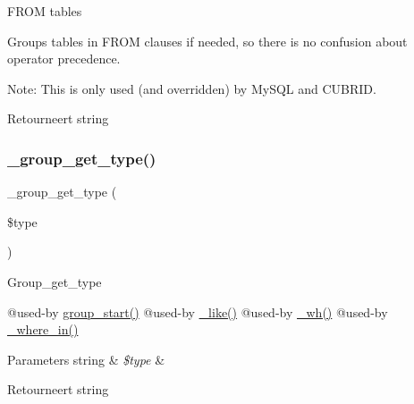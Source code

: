 F\+R\+OM tables

Groups tables in F\+R\+OM clauses if needed, so there is no confusion about operator precedence.

Note\+: This is only used (and overridden) by My\+S\+QL and C\+U\+B\+R\+ID.

\begin{DoxyReturn}{Retourneert}
string 
\end{DoxyReturn}
\mbox{\label{class_c_i___d_b__query__builder_a0101619da9c48cfa269730ace38a774a}} 
\subsubsection{\texorpdfstring{\_group\_get\_type()}{\_group\_get\_type()}}
{\footnotesize\ttfamily \+\_\+group\+\_\+get\+\_\+type (\begin{DoxyParamCaption}\item[{}]{\$type }\end{DoxyParamCaption})\hspace{0.3cm}{\ttfamily [protected]}}

Group\+\_\+get\+\_\+type

@used-\/by \mbox{\hyperlink{class_c_i___d_b__query__builder_a0ad001f7f7d1a41fdee4a85b4f7db9b4}{group\+\_\+start()}} @used-\/by \mbox{\hyperlink{class_c_i___d_b__query__builder_abe8f3477d4b15bf422fc52ba753056b5}{\+\_\+like()}} @used-\/by \mbox{\hyperlink{class_c_i___d_b__query__builder_a616af9ae6c40b3fe7074a8517207934f}{\+\_\+wh()}} @used-\/by \mbox{\hyperlink{class_c_i___d_b__query__builder_a768333bb814b0e99783117da4b51f097}{\+\_\+where\+\_\+in()}}


\begin{DoxyParams}[1]{Parameters}
string & {\em \$type} & \\
\hline
\end{DoxyParams}
\begin{DoxyReturn}{Retourneert}
string 
\end{DoxyReturn}
\mbox{\label{class_c_i___d_b__query__builder_a1978e1358c812587a46e242630365099}} 
